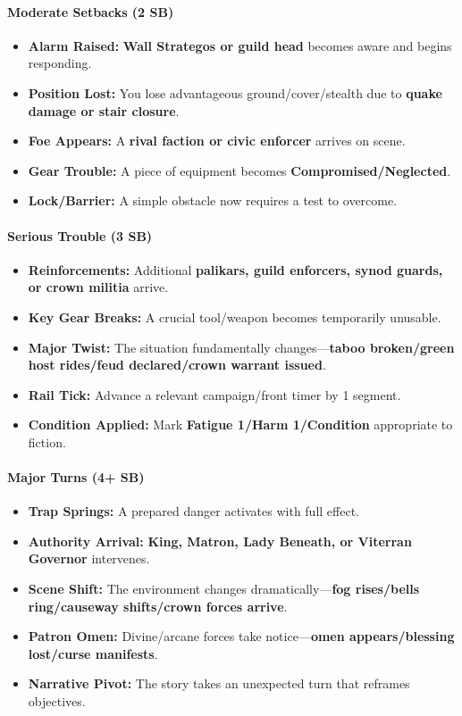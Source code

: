 \paragraph{Moderate Setbacks (2 SB)}
\begin{itemize}
\item \textbf{Alarm Raised:} \textbf{Wall Strategos or guild head} becomes aware and begins responding.
\item \textbf{Position Lost:} You lose advantageous ground/cover/stealth due to \textbf{quake damage or stair closure}.
\item \textbf{Foe Appears:} A \textbf{rival faction or civic enforcer} arrives on scene.
\item \textbf{Gear Trouble:} A piece of equipment becomes \textbf{Compromised/Neglected}.
\item \textbf{Lock/Barrier:} A simple obstacle now requires a test to overcome.
\end{itemize}

\paragraph{Serious Trouble (3 SB)}
\begin{itemize}
\item \textbf{Reinforcements:} Additional \textbf{palikars, guild enforcers, synod guards, or crown militia} arrive.
\item \textbf{Key Gear Breaks:} A crucial tool/weapon becomes temporarily unusable.
\item \textbf{Major Twist:} The situation fundamentally changes---\textbf{taboo broken/green host rides/feud declared/crown warrant issued}.
\item \textbf{Rail Tick:} Advance a relevant campaign/front timer by 1 segment.
\item \textbf{Condition Applied:} Mark \textbf{Fatigue 1/Harm 1/Condition} appropriate to fiction.
\end{itemize}

\paragraph{Major Turns (4+ SB)}
\begin{itemize}
\item \textbf{Trap Springs:} A prepared danger activates with full effect.
\item \textbf{Authority Arrival:} \textbf{King, Matron, Lady Beneath, or Viterran Governor} intervenes.
\item \textbf{Scene Shift:} The environment changes dramatically---\textbf{fog rises/bells ring/causeway shifts/crown forces arrive}.
\item \textbf{Patron Omen:} Divine/arcane forces take notice---\textbf{omen appears/blessing lost/curse manifests}.
\item \textbf{Narrative Pivot:} The story takes an unexpected turn that reframes objectives.
\end{itemize}

